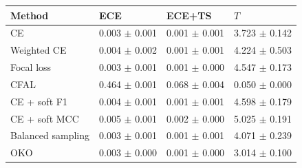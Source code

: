 \begin{tabular}{llll}
\toprule
Method & ECE & ECE+TS & $T$\\
\midrule
CE & \num{0.003} $\pm$ \num{0.001} & \num{0.001} $\pm$ \num{0.001} & \num{3.723} $\pm$ \num{0.142}\\
Weighted CE & \num{0.004} $\pm$ \num{0.002} & \num{0.001} $\pm$ \num{0.001} & \num{4.224} $\pm$ \num{0.503}\\
Focal loss & \num{0.003} $\pm$ \num{0.001} & \num{0.001} $\pm$ \num{0.000} & \num{4.547} $\pm$ \num{0.173}\\
CFAL & \num{0.464} $\pm$ \num{0.001} & \num{0.068} $\pm$ \num{0.004} & \num{0.050} $\pm$ \num{0.000}\\
CE + soft F1 & \num{0.004} $\pm$ \num{0.001} & \num{0.001} $\pm$ \num{0.001} & \num{4.598} $\pm$ \num{0.179}\\
CE + soft MCC & \num{0.005} $\pm$ \num{0.001} & \num{0.002} $\pm$ \num{0.000} & \num{5.025} $\pm$ \num{0.191}\\
Balanced sampling & \num{0.003} $\pm$ \num{0.001} & \num{0.001} $\pm$ \num{0.001} & \num{4.071} $\pm$ \num{0.239}\\
OKO & \num{0.003} $\pm$ \num{0.000} & \num{0.001} $\pm$ \num{0.000} & \num{3.014} $\pm$ \num{0.100}\\
\bottomrule
\end{tabular}
